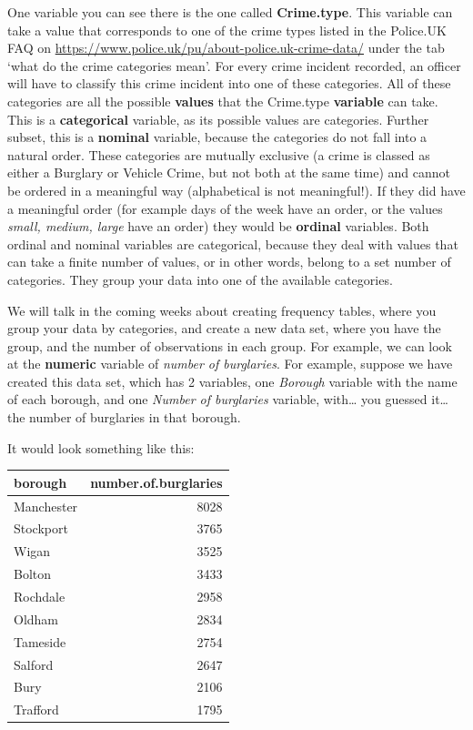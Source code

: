 \documentclass[
]{book}
\begin{document}
One variable you can see there is the one called \textbf{Crime.type}. This variable can take a value that corresponds to one of the crime types listed in the Police.UK FAQ on \url{https://www.police.uk/pu/about-police.uk-crime-data/} under the tab `what do the crime categories mean'. For every crime incident recorded, an officer will have to classify this crime incident into one of these categories. All of these categories are all the possible \textbf{values} that the Crime.type \textbf{variable} can take. This is a \textbf{categorical} variable, as its possible values are categories. Further subset, this is a \textbf{nominal} variable, because the categories do not fall into a natural order. These categories are mutually exclusive (a crime is classed as either a Burglary or Vehicle Crime, but not both at the same time) and cannot be ordered in a meaningful way (alphabetical is not meaningful!). If they did have a meaningful order (for example days of the week have an order, or the values \emph{small, medium, large} have an order) they would be \textbf{ordinal} variables. Both ordinal and nominal variables are categorical, because they deal with values that can take a finite number of values, or in other words, belong to a set number of categories. They group your data into one of the available categories.

We will talk in the coming weeks about creating frequency tables, where you group your data by categories, and create a new data set, where you have the group, and the number of observations in each group. For example, we can look at the \textbf{numeric} variable of \emph{number of burglaries}. For example, suppose we have created this data set, which has 2 variables, one \emph{Borough} variable with the name of each borough, and one \emph{Number of burglaries} variable, with\ldots{} you guessed it\ldots{} the number of burglaries in that borough.

It would look something like this:

\begin{tabular}{l|r}
\hline
borough & number.of.burglaries\\
\hline
Manchester & 8028\\
\hline
Stockport & 3765\\
\hline
Wigan & 3525\\
\hline
Bolton & 3433\\
\hline
Rochdale & 2958\\
\hline
Oldham & 2834\\
\hline
Tameside & 2754\\
\hline
Salford & 2647\\
\hline
Bury & 2106\\
\hline
Trafford & 1795\\
\hline
\end{tabular}
\end{document}
